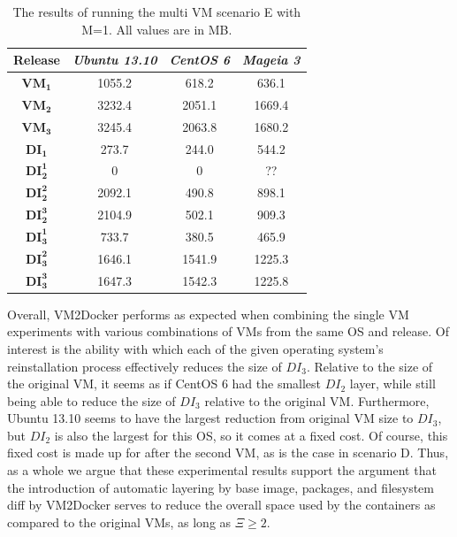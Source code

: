 \begin{enumerate}
\begin{table}[h]
    \begin{tabular}{| c | c | c | c|}
    \hline
    \bfseries Release & \itshape Ubuntu 13.10 & \itshape CentOS 6 & \itshape Mageia 3\\ \hline
\bfseries $\boldsymbol{VM_1}$ & 1055.2 & 618.2 & 636.1\\ \hline
\bfseries $\boldsymbol{VM_2}$ & 3232.4 & 2051.1 & 1669.4\\ \hline
\bfseries $\boldsymbol{VM_3}$ &  3245.4 & 2063.8 & 1680.2\\ \hline \hline
    \bfseries $\boldsymbol{DI_1}$ & 273.7 & 244.0 & 544.2\\ \hline
    \bfseries $\boldsymbol{DI_2^1}$ & 0 & 0 & ??\\ \hline 
\bfseries $\boldsymbol{DI_2^2}$ & 2092.1 & 490.8 & 898.1\\ \hline 
\bfseries $\boldsymbol{DI_2^3}$ & 2104.9 & 502.1 & 909.3\\ \hline 
\bfseries $\boldsymbol{DI_3^1}$  & 733.7 & 380.5 & 465.9\\ \hline 
\bfseries $\boldsymbol{DI_3^2}$ & 1646.1 & 1541.9 & 1225.3\\ \hline 
\bfseries $\boldsymbol{DI_3^3}$ & 1647.3 & 1542.3 & 1225.8\\ \hline 
    \end{tabular}
\caption{The results of running the multi VM scenario E with M=1. All values are in MB.}
\label{table:multiscenarioe}
\end{table}

\end{enumerate}


Overall, VM2Docker performs as expected when combining the single VM experiments with various combinations of VMs from the same OS and release. Of interest is the ability with which each of the given operating system's reinstallation process effectively reduces the size of $DI_3$. Relative to the size of the original VM, it seems as if CentOS 6 had the smallest $DI_2$ layer, while still being able to reduce the size of $DI_3$ relative to the original VM. Furthermore, Ubuntu 13.10 seems to have the largest reduction from original VM size to $DI_3$, but $DI_2$ is also the largest for this OS, so it comes at a fixed cost. Of course, this fixed cost is made up for after the second VM, as is the case in scenario D. Thus, as a whole we argue that these experimental results support the argument that the introduction of automatic layering by base image, packages, and filesystem diff by VM2Docker serves to reduce the overall space used by the containers as compared to the original VMs, as long as $\Xi \ge 2$. 



